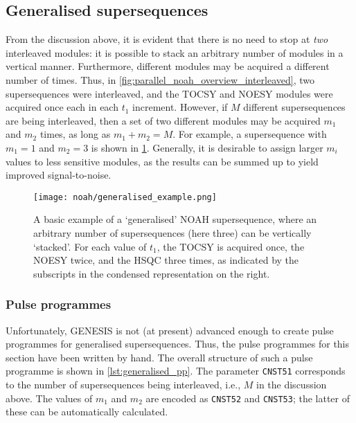 \subsection{Generalised supersequences}
\label{sec:noah__parallel_generalised}

From the discussion above, it is evident that there is no need to stop at \textit{two} interleaved modules: it is possible to stack an arbitrary number of modules in a vertical manner.
Furthermore, different modules may be acquired a different number of times.
Thus, in \cref{fig:parallel_noah_overview_interleaved}, two supersequences were interleaved, and the TOCSY and NOESY modules were acquired once each in each $t_1$ increment.
However, if $M$ different supersequences are being interleaved, then a set of two different modules may be acquired $m_1$ and $m_2$ times, as long as $m_1 + m_2 = M$.
For example, a supersequence with $m_1 = 1$ and $m_2 = 3$ is shown in \cref{fig:generalised_example}.
Generally, it is desirable to assign larger $m_i$ values to less sensitive modules, as the results can be summed up to yield improved signal-to-noise.

\begin{figure}[!ht]
    \centering
    \texttt{[image: noah/generalised\_example.png]}%
    \caption[A basic example of a generalised supersequence]{
        A basic example of a `generalised' NOAH supersequence, where an arbitrary number of supersequences (here three) can be vertically `stacked'.
        For each value of $t_1$, the TOCSY is acquired once, the NOESY twice, and the HSQC three times, as indicated by the subscripts in the condensed representation on the right.
    }
    \label{fig:generalised_example}
\end{figure}

\subsubsection{Pulse programmes}

Unfortunately, GENESIS is not (at present) advanced enough to create pulse programmes for generalised supersequences.
Thus, the pulse programmes for this section have been written by hand.
The overall structure of such a pulse programme is shown in \cref{lst:generalised_pp}.
The parameter \texttt{CNST51} corresponds to the number of supersequences being interleaved, i.e., $M$ in the discussion above.
The values of $m_1$ and $m_2$ are encoded as \texttt{CNST52} and \texttt{CNST53}; the latter of these can be automatically calculated.

